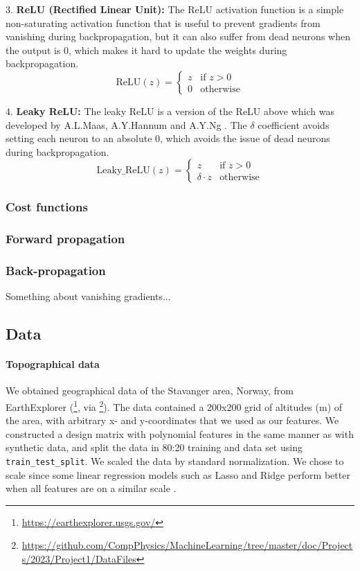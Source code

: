 3. \textbf{ReLU (Rectified Linear Unit):}
The ReLU activation function is a simple non-saturating activation function that is useful to prevent gradients from vanishing during backpropagation, 
but it can also suffer from dead neurons when the output is 0, which makes it hard to update the weights during backpropagation.  
\[
\text{ReLU}(z) = 
\begin{cases} 
   z & \text{if } z > 0 \\
   0 & \text{otherwise}
\end{cases}
\]

4. \textbf{Leaky ReLU:}
The leaky ReLU is a version of the ReLU above which was developed by A.L.Maas, A.Y.Hannum and A.Y.Ng \cite{relu_best_ever}. The $\delta$ coefficient avoids
setting each neuron to an absolute 0, which avoids the issue of dead neurons during backpropagation.
\[
\text{Leaky\_ReLU}(z) = 
\begin{cases} 
   z & \text{if } z > 0 \\
   \delta \cdot z & \text{otherwise}
\end{cases}
\]


\subsubsection{Cost functions}\label{sssec:cost_functions}


\subsubsection{Forward propagation}\label{sssec:forward_propagation}


\subsubsection{Back-propagation}\label{sssec:backpropagation}

Something about vanishing gradients...


\subsection{Data}\label{ssec:data}
%
\paragraph{Topographical data}
We obtained geographical data of the Stavanger area, Norway, from EarthExplorer (\footnote{\url{https://earthexplorer.usgs.gov/}}, 
via \footnote{\url{https://github.com/CompPhysics/MachineLearning/tree/master/doc/Projects/2023/Project1/DataFiles}}). 
The data contained a 200x200 grid of altitudes (m) of the area, with arbitrary x- and y-coordinates that we used as our features. 
We constructed a design matrix with polynomial features in the same manner as with synthetic data, and split the data in 80:20 training 
and data set using \texttt{train\_test\_split}. We scaled the data by standard normalization. We chose to scale since some linear regression 
models such as Lasso and Ridge perform better when all features are on a similar scale . 

